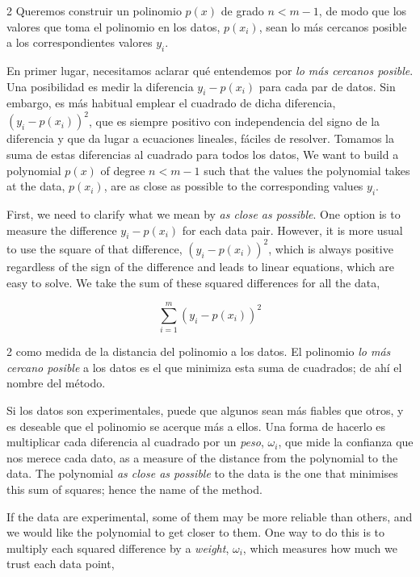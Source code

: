 \begin{paracol}{2}
Queremos construir un polinomio $p(x)$ de grado $n < m-1$, de modo que los valores que toma el polinomio en los datos, $p(x_i)$, sean lo más cercanos posible a los correspondientes valores $y_i$.

En primer lugar, necesitamos aclarar qué entendemos por \emph{lo más cercanos posible}. Una posibilidad es medir la diferencia $y_i-p(x_i)$ para cada par de datos. Sin embargo, es más habitual emplear el cuadrado de dicha diferencia, $\left(y_i-p(x_i)\right)^2$, que es siempre positivo con independencia del signo de la diferencia y que da lugar a ecuaciones lineales, fáciles de resolver. Tomamos la suma de estas diferencias al cuadrado para todos los datos,
\switchcolumn
We want to build a polynomial $p(x)$ of degree $n < m-1$ such that the values the polynomial takes at the data, $p(x_i)$, are as close as possible to the corresponding values $y_i$.

First, we need to clarify what we mean by \emph{as close as possible}. One option is to measure the difference $y_i-p(x_i)$ for each data pair. However, it is more usual to use the square of that difference, $\left(y_i-p(x_i)\right)^2$, which is always positive regardless of the sign of the difference and leads to linear equations, which are easy to solve. We take the sum of these squared differences for all the data,
\end{paracol}
\begin{equation*}
\sum_{i=1}^m \left(y_i-p(x_i)\right)^2
\end{equation*}
\begin{paracol}{2}
\noindent como medida de la distancia del polinomio a los datos. El polinomio \emph{lo más cercano posible} a los datos es el que minimiza esta suma de cuadrados; de ahí el nombre del método.

Si los datos son experimentales, puede que algunos sean más fiables que otros, y es deseable que el polinomio se acerque más a ellos. Una forma de hacerlo es multiplicar cada diferencia al cuadrado por un \emph{peso}, $\omega_i$, que mide la confianza que nos merece cada dato,
\switchcolumn
\noindent as a measure of the distance from the polynomial to the data. The polynomial \emph{as close as possible} to the data is the one that minimises this sum of squares; hence the name of the method.

If the data are experimental, some of them may be more reliable than others, and we would like the polynomial to get closer to them. One way to do this is to multiply each squared difference by a \emph{weight}, $\omega_i$, which measures how much we trust each data point,
\end{paracol}
